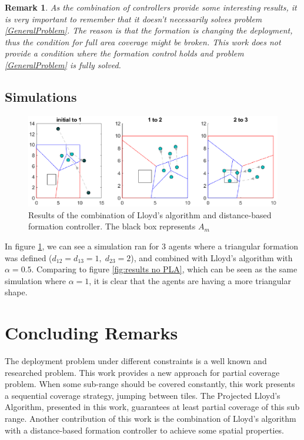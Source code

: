 \documentclass{iacas}
\newtheorem{remark}{Remark}
\begin{document}
\begin{remark}As the combination of controllers provide some interesting results, it is very important to remember that it doesn't necessarily solves problem \ref{GeneralProblem}. The reason is that the formation is changing the deployment, thus the condition for full area coverage might be broken. This work \emph{does not} provide a condition where the formation control holds \emph{and} problem \ref{GeneralProblem} is fully solved.
\end{remark}
\subsection{Simulations}

\begin{figure}[H]
\includegraphics[scale=0.8]{figures/proposed-sol/results/sim3-3agents-3partitions-noPLA-formation.eps}
\caption{Results of the combination of Lloyd's algorithm and distance-based formation controller. The black box represents $A_m$}
\label{fig:results formation, no PLA}
\end{figure}

In figure \ref{fig:results formation, no PLA}, we can see a simulation ran for 3 agents where a triangular formation was defined ($d_{12} = d_{13} = 1,\; d_{23} = 2$), and combined with Lloyd's algorithm with $\alpha = 0.5$. Comparing to figure \ref{fig:results no PLA}, which can be seen as the same simulation where $\alpha = 1$, it is clear that the agents are having a more triangular shape.

\section{Concluding Remarks}
The deployment problem under different constraints is a well known and researched problem. This work provides a new approach for partial coverage problem. When some sub-range should be covered constantly, this work presents a sequential coverage strategy, jumping between tiles. The Projected Lloyd's Algorithm, presented in this work, guarantees at least partial coverage of this sub range. Another contribution of this work is the combination of Lloyd's algorithm with a distance-based formation controller to achieve some spatial properties.
\end{document}
